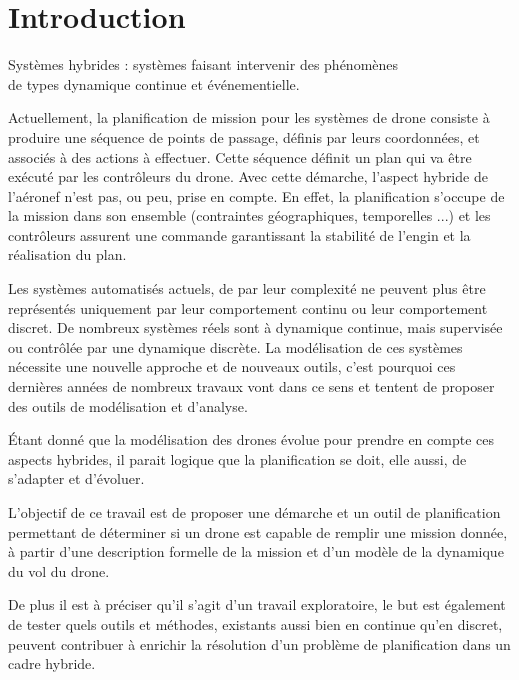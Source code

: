 \chapter{Introduction}

\begin{extrait}{}
	Systèmes hybrides : systèmes faisant intervenir des phénomènes\\
	 de types dynamique continue et événementielle.
\end{extrait}

Actuellement, la planification de mission pour les systèmes de drone consiste à produire une séquence de points de passage, définis par leurs coordonnées, et associés à des actions à effectuer. Cette séquence définit un plan qui va être exécuté par les contrôleurs du drone. Avec cette démarche, l'aspect hybride de l'aéronef n'est pas, ou peu, prise en compte. En effet, la planification s'occupe de la mission dans son ensemble (contraintes géographiques, temporelles ...) et les contrôleurs assurent une commande garantissant la stabilité de l'engin et la réalisation du plan.

Les systèmes automatisés actuels, de par leur complexité ne peuvent plus être représentés uniquement par leur comportement continu ou leur comportement discret. De nombreux systèmes réels sont à dynamique continue, mais supervisée ou contrôlée par une dynamique discrète. La modélisation de ces systèmes nécessite une nouvelle approche et de nouveaux outils, c'est pourquoi ces dernières années de nombreux travaux vont dans ce sens et tentent de proposer des outils de modélisation et d'analyse.

Étant donné que la modélisation des drones évolue pour prendre en compte ces aspects hybrides, il parait logique que la planification se doit, elle aussi, de s'adapter et d'évoluer. 


L'objectif de ce travail est de proposer une démarche et un outil de planification permettant de déterminer si un drone est capable de remplir une mission donnée, à partir d'une description formelle de la mission et d'un modèle de la dynamique du vol du drone.

De plus il est à préciser qu'il s'agit d'un travail exploratoire, le but est également de tester quels outils et méthodes, existants aussi bien en continue qu'en discret, peuvent contribuer à enrichir la résolution d'un problème de planification dans un cadre hybride.
\begin{center}
\end{center}
\pagebreak
